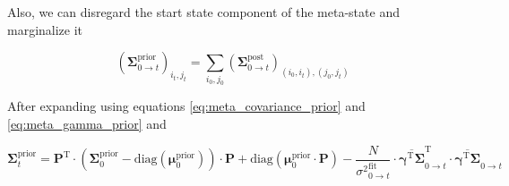 \documentclass[pdflatex,sn-mathphys-num]{sn-jnl}%
\theoremstyle{thmstyleone}%
\theoremstyle{thmstyletwo}%
\theoremstyle{thmstylethree}%
\begin{document}
Also, we can disregard the start state component of the meta-state and marginalize it 


\begin{equation}
	(\boldsymbol{\Sigma}^{\mathrm{prior}}_{0 \rightarrow t})_{i_{t}, j_{t}} = \sum_{i_{0}, j_{0}} (\boldsymbol{\Sigma}^{\mathrm{post}}_{0 \rightarrow t})_{(i_{0}, i_{t}), (j_{0}, j_{t})}
	\label{eq:prior_covariance_marginalization}
\end{equation}

After expanding using equations \ref{eq:meta_covariance_prior} and \ref{eq:meta_gamma_prior} and 


\begin{equation}
	\boldsymbol{\Sigma}^{\mathrm{prior}}_{t} = 
	\boldsymbol{P}^{\mathrm{T}} \cdot \left( \boldsymbol{\Sigma}^{\mathrm{prior}}_{0} - \mathrm{diag}(\boldsymbol{\mu}^{\mathrm{prior}}_{0}) \right) \cdot \boldsymbol{P}
	+ \mathrm{diag}(\boldsymbol{\mu}^{\mathrm{prior}}_{0} \cdot \boldsymbol{P}) 
	- \frac{N}{{\sigma^2}^{\mathrm{fit}}_{0 \rightarrow t}} \cdot
	\overline{\boldsymbol{\gamma}^{\mathrm{T}} \boldsymbol{\Sigma}}_{0 \rightarrow t}^{\mathrm{T}} \cdot \overline{\boldsymbol{\gamma}^{\mathrm{T}} \boldsymbol{\Sigma}}_{0 \rightarrow t}
	\label{eq:prior_covariance_update_0_t}
\end{equation}
\end{document}
